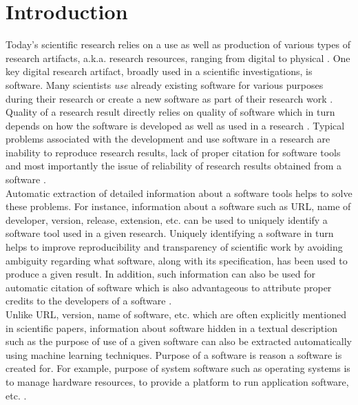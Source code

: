 \chapter{Introduction}
\label{ch:intro}

Today’s scientific research relies on a use as well as production of various types of research artifacts, a.k.a. research resources, ranging from digital to physical \citep{schindler2019annotation}. One key digital research artifact, broadly used in a scientific investigations, is software. Many scientists \emph{use} already existing software for various purposes during their research or create a new software as part of their research work \citep{goble2014better, hannay2009scientists}. \\


Quality of a research result directly relies on quality of software which in turn depends on  how the software is developed as well as used in a research \citep{hannay2009scientists}. Typical problems associated with the development and use software in a research are inability to reproduce research results, lack of proper citation for software tools and most importantly the issue of reliability of research results obtained from a software \citep{schindler2021somesci, baker2016reproducibility, soergel2014rampant}. \\


Automatic extraction of detailed information about a software tools helps to solve these problems. For instance, information about a software such as \ac{URL}, name of developer, version, release, extension, etc. can be used to uniquely identify a software tool used in a given research. Uniquely identifying a software in turn helps to improve reproducibility and transparency of scientific work by avoiding ambiguity regarding what software, along with its specification,  has been used to produce a given result. In addition, such information can also be used for automatic citation of software which is also advantageous to attribute proper credits to the developers of a software \citep{kruger2019literature}. \\


Unlike \ac{URL}, version, name of software, etc. which are often explicitly mentioned in scientific papers, information about software hidden in a textual description such as the purpose of use of a given software can also be extracted automatically using machine learning techniques. Purpose of a software is reason a software is created for. For example, purpose of system software such as operating systems is to manage hardware resources, to provide a platform to run application software, etc. \citep{enwiki:1076010620}. \\


